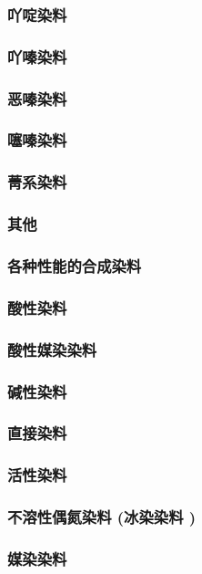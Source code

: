 \documentclass[UTF8]{../../ApplicationUniverse}
\begin{document}
    \subsubsection{吖啶染料}
    \subsubsection{吖嗪染料}
    \subsubsection{恶嗪染料}
    \subsubsection{噻嗪染料}
    \subsubsection{菁系染料}
    \subsubsection{其他}
\subsubsection{各种性能的合成染料}
    \subsubsection{酸性染料}
    \subsubsection{酸性媒染染料}
    \subsubsection{碱性染料}
    \subsubsection{直接染料}
    \subsubsection{活性染料}
    \subsubsection{不溶性偶氮染料 (冰染染料 )}
    \subsubsection{媒染染料}
\end{document}
